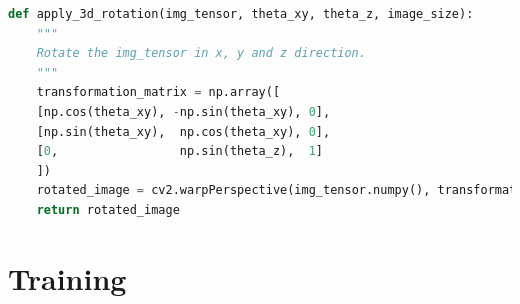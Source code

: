 \begin{lstlisting}[language=Python, caption={Rotation der Piktograme mit OpenCV}]
def apply_3d_rotation(img_tensor, theta_xy, theta_z, image_size):
    """
    Rotate the img_tensor in x, y and z direction.
    """
    transformation_matrix = np.array([
    [np.cos(theta_xy), -np.sin(theta_xy), 0],
    [np.sin(theta_xy),  np.cos(theta_xy), 0],
    [0,                 np.sin(theta_z),  1] 
    ])
    rotated_image = cv2.warpPerspective(img_tensor.numpy(), transformation_matrix, (image_size, image_size))
    return rotated_image    
\end{lstlisting}

\section{Training}